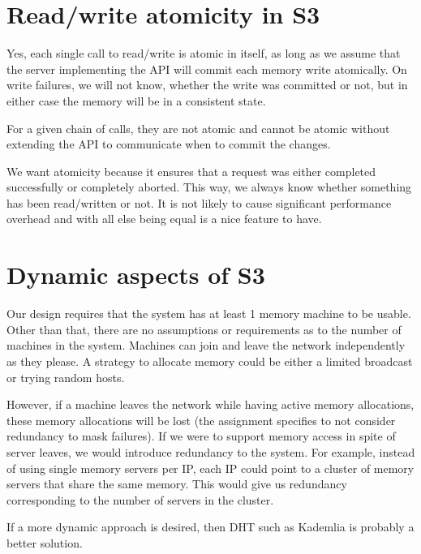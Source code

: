 \section{Read/write atomicity in S3}
Yes, each single call to read/write is atomic in itself, as long as we
assume that the server implementing the API will commit each memory
write atomically. On write failures, we will not know, whether the
write was committed or not, but in either case the memory will be in a
consistent state.

For a given chain of calls, they are not atomic and cannot be atomic
without extending the API to communicate when to commit the changes.

We want atomicity because it ensures that a request was either
completed successfully or completely aborted. This way, we always know
whether something has been read/written or not. It is not likely to
cause significant performance overhead and with all else being equal
is a nice feature to have.

\section{Dynamic aspects of S3}
Our design requires that the system has at least 1 memory machine to
be usable. Other than that, there are no assumptions or requirements
as to the number of machines in the system. Machines can join and
leave the network independently as they please. A strategy to allocate
memory could be either a limited broadcast or trying random hosts.

However, if a machine leaves the network while having active memory
allocations, these memory allocations will be lost (the assignment
specifies to not consider redundancy to mask failures). If we were to
support memory access in spite of server leaves, we would introduce
redundancy to the system. For example, instead of using single memory
servers per IP, each IP could point to a cluster of memory servers
that share the same memory. This would give us redundancy
corresponding to the number of servers in the cluster.

If a more dynamic approach is desired, then DHT such as Kademlia is
probably a better solution.
